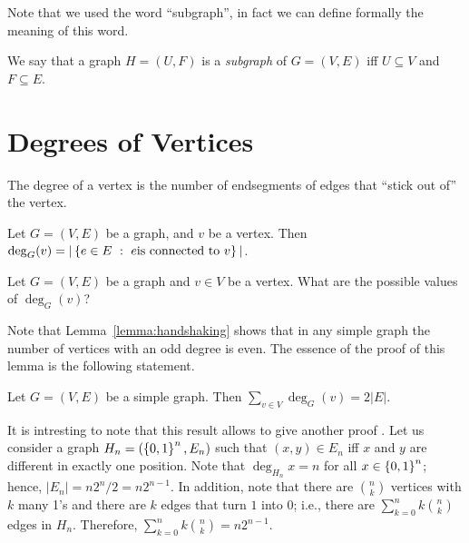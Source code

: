 Note that we used the word ``subgraph'', in fact we can define formally the
meaning of this word.
\begin{definition}
  We say that a graph $H = (U, F)$ is a \emph{subgraph} of $G = (V, E)$ iff
  $U \subseteq V$ and $F \subseteq E$.
\end{definition}

\section{Degrees of Vertices}
The degree of a vertex is the number of endsegments of edges that ``stick out
of'' the vertex.
\begin{definition}
  Let $G = (V, E)$ be a graph, and $v$ be a vertex. Then
  $\deg_G(v) = |\set[{e \text{is connected to } v}]{e \in E}|$.
\end{definition}

\begin{exercise}
  Let $G = (V, E)$ be a graph and $v \in V$ be a vertex.
  What are the possible values of $\deg_G(v)$?
\end{exercise}

Note that Lemma~\ref{lemma:handshaking} shows that in any simple graph the
number of vertices with an odd degree is even.
The essence of the proof of this lemma is the following statement.
\begin{theorem}
\label{theorem:handshaking-graphs}
  Let $G = (V, E)$ be a simple graph. Then $\sum_{v \in V} \deg_G(v) = 2|E|$.
\end{theorem}

It is intresting to note that this result allows to give another proof 
. Let us consider a graph $H_n = 
(\set{0, 1}^n, E_n)$ such that $(x, y) \in E_n$ iff $x$ and $y$ are 
different in exactly one position. Note that $\deg_{H_n} x = n$ for all 
$x \in \set{0, 1}^n$; hence, $|E_n| = n 2^n / 2 = n 2^{n - 1}$. In addition,
note that there are $\binom{n}{k}$ vertices with $k$ many 1's and there are
$k$ edges that turn $1$ into $0$; i.e., there are 
$\sum_{k = 0}^n k \binom{n}{k}$ edges in $H_n$. Therefore, 
$\sum_{k = 0}^n k \binom{n}{k} = n 2^{n - 1}$.

